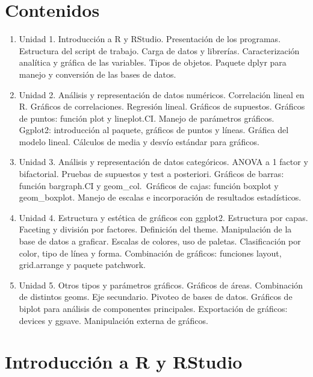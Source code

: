 \documentclass[
]{article}
\providecommand{\tightlist}{%
  \setlength{\itemsep}{0pt}\setlength{\parskip}{0pt}}
\begin{document}
\section*{Contenidos}\label{contenidos}

\begin{enumerate}
\def\labelenumi{\arabic{enumi}.}
\tightlist
\item
  Unidad 1. Introducción a R y RStudio. Presentación de los programas.
  Estructura del script de trabajo. Carga de datos y librerías.
  Caracterización analítica y gráfica de las variables. Tipos de
  objetos. Paquete dplyr para manejo y conversión de las bases de
  datos.\\
\item
  Unidad 2. Análisis y representación de datos numéricos. Correlación
  lineal en R. Gráficos de correlaciones. Regresión lineal. Gráficos de
  supuestos. Gráficos de puntos: función plot y lineplot.CI. Manejo de
  parámetros gráficos. Ggplot2: introducción al paquete, gráficos de
  puntos y líneas. Gráfica del modelo lineal. Cálculos de media y desvío
  estándar para gráficos.
\item
  Unidad 3. Análisis y representación de datos categóricos. ANOVA a 1
  factor y bifactorial. Pruebas de supuestos y test a posteriori.
  Gráficos de barras: función bargraph.CI y geom\_col.~Gráficos de
  cajas: función boxplot y geom\_boxplot. Manejo de escalas e
  incorporación de resultados estadísticos.
\item
  Unidad 4. Estructura y estética de gráficos con ggplot2. Estructura
  por capas. Faceting y división por factores. Definición del theme.
  Manipulación de la base de datos a graficar. Escalas de colores, uso
  de paletas. Clasificación por color, tipo de línea y forma.
  Combinación de gráficos: funciones layout, grid.arrange y paquete
  patchwork.
\item
  Unidad 5. Otros tipos y parámetros gráficos. Gráficos de áreas.
  Combinación de distintos geoms. Eje secundario. Pivoteo de bases de
  datos. Gráficos de biplot para análisis de componentes principales.
  Exportación de gráficos: devices y ggsave. Manipulación externa de
  gráficos.
\end{enumerate}

\section{Introducción a R y
RStudio}\label{introducciuxf3n-a-r-y-rstudio}
\end{document}
